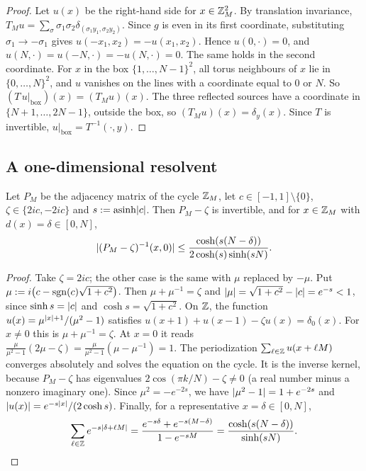 \begin{proof}
Let $u(x)$ be the right-hand side for $x\in\mathbb{Z}_M^2$. By translation invariance, $T_Mu=\sum_\sigma\sigma_1\sigma_2\delta_{(\sigma_1y_1,\sigma_2y_2)}$. Since $g$ is even in its first coordinate, substituting $\sigma_1\to-\sigma_1$ gives $u(-x_1,x_2)=-u(x_1,x_2)$. Hence $u(0,\cdot)=0$, and $u(N,\cdot)=u(-N,\cdot)=-u(N,\cdot)=0$. The same holds in the second coordinate. For $x$ in the box $\{1,\dots,N-1\}^2$, all torus neighbours of $x$ lie in $\{0,\dots,N\}^2$, and $u$ vanishes on the lines with a coordinate equal to $0$ or $N$. So $(T\,u|_{\mathrm{box}})(x)=(T_Mu)(x)$. The three reflected sources have a coordinate in $\{N+1,\dots,2N-1\}$, outside the box, so $(T_Mu)(x)=\delta_y(x)$. Since $T$ is invertible, $u|_{\mathrm{box}}=T^{-1}(\cdot,y)$.
\end{proof}

\subsection{A one-dimensional resolvent}

\begin{lemma}[1D resolvent]\label{lem:resolvent}
Let $P_M$ be the adjacency matrix of the cycle $\mathbb{Z}_M$, let $c\in[-1,1]\setminus\{0\}$, $\zeta\in\{2ic,-2ic\}$ and $s:=\operatorname{asinh}\lvert c\rvert$. Then $P_M-\zeta$ is invertible, and for $x\in\mathbb{Z}_M$ with $d(x)=\delta\in[0,N]$,
\[
  \lvert (P_M-\zeta)^{-1}(x,0)\rvert\le\frac{\cosh(s(N-\delta))}{2\cosh(s)\sinh(sN)} .
\]
\end{lemma}

\begin{proof}
Take $\zeta=2ic$; the other case is the same with $\mu$ replaced by $-\mu$. Put $\mu:=i\bigl(c-\operatorname{sgn}(c)\sqrt{1+c^2}\bigr)$. Then $\mu+\mu^{-1}=\zeta$ and $\lvert \mu\rvert=\sqrt{1+c^2}-\lvert c\rvert=e^{-s}<1$, since $\sinh s=\lvert c\rvert$ and $\cosh s=\sqrt{1+c^2}$. On $\mathbb{Z}$, the function $u(x)=\mu^{\lvert x\rvert+1}/(\mu^2-1)$ satisfies $u(x+1)+u(x-1)-\zeta u(x)=\delta_0(x)$. For $x\ne0$ this is $\mu+\mu^{-1}=\zeta$. At $x=0$ it reads $\frac{\mu}{\mu^2-1}(2\mu-\zeta)=\frac{\mu}{\mu^2-1}(\mu-\mu^{-1})=1$. The periodization $\sum_{\ell\in\mathbb{Z}}u(x+\ell M)$ converges absolutely and solves the equation on the cycle. It is the inverse kernel, because $P_M-\zeta$ has eigenvalues $2\cos(\pi k/N)-\zeta\ne0$ (a real number minus a nonzero imaginary one). Since $\mu^2=-e^{-2s}$, we have $\lvert \mu^2-1\rvert=1+e^{-2s}$ and $\lvert u(x)\rvert=e^{-s\lvert x\rvert}/(2\cosh s)$. Finally, for a representative $x=\delta\in[0,N]$,
\[
  \sum_{\ell\in\mathbb{Z}}e^{-s\lvert \delta+\ell M\rvert}=\frac{e^{-s\delta}+e^{-s(M-\delta)}}{1-e^{-sM}}=\frac{\cosh(s(N-\delta))}{\sinh(sN)} .\qedhere
\]
\end{proof}

